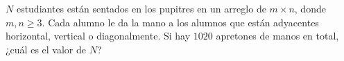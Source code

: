 $N$ estudiantes están sentados en los pupitres en un arreglo de $m \times n$, donde $m, n \ge 3$. Cada alumno le da la mano a los alumnos que están adyacentes horizontal, vertical o diagonalmente. Si hay $1020$ apretones de manos en total, ¿cuál es el valor de $N$? 